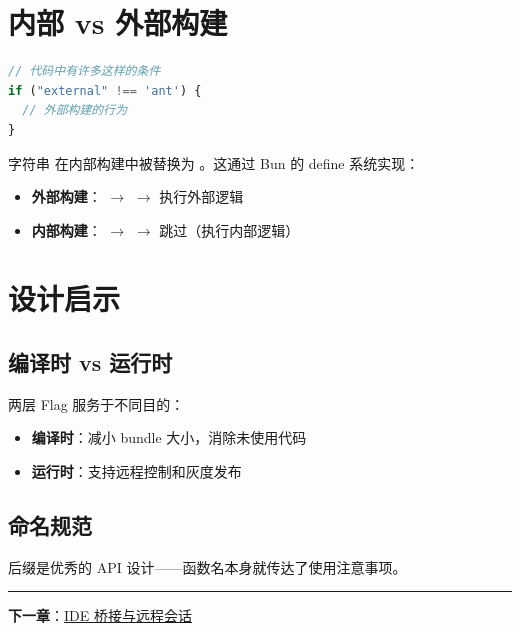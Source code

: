 \section{内部 vs 外部构建}

\begin{lstlisting}[language=TypeScript,breaklines=true]
// 代码中有许多这样的条件
if ("external" !== 'ant') {
  // 外部构建的行为
}
\end{lstlisting}

字符串  在内部构建中被替换为 。这通过 Bun 的 define 系统实现：
\begin{itemize}[nosep]
  \item \textbf{外部构建}： $\rightarrow$  $\rightarrow$ 执行外部逻辑
  \item \textbf{内部构建}： $\rightarrow$  $\rightarrow$ 跳过（执行内部逻辑）
\end{itemize}

\section{设计启示}

\subsection{编译时 vs 运行时}

两层 Flag 服务于不同目的：
\begin{itemize}[nosep]
  \item \textbf{编译时}：减小 bundle 大小，消除未使用代码
  \item \textbf{运行时}：支持远程控制和灰度发布
\end{itemize}

\subsection{命名规范}

 后缀是优秀的 API 设计——函数名本身就传达了使用注意事项。

\bigskip\noindent\rule{\textwidth}{0.4pt}\bigskip

\textbf{下一章}：\href{./chapter-14-bridge-remote.md}{IDE 桥接与远程会话}
